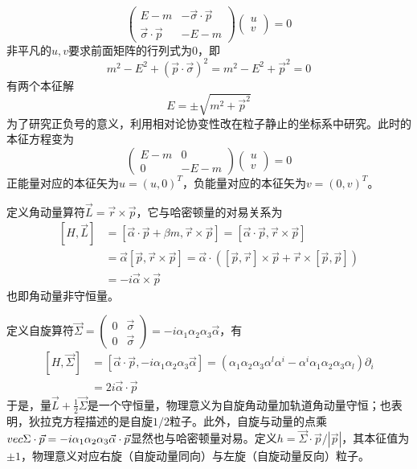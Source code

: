 \documentclass[a4paper,11pt]{ctexart}
\newcommand{\beq}{\begin{equation}}
\newcommand{\eeq}{\end{equation}}
\newcommand{\bea}{\begin{equation}\begin{aligned}}
\newcommand{\eea}{\end{aligned}\end{equation}}
\newcommand{\mt}[4]{\begin{pmatrix}#1 & #2 \\ #3 & #4 \end{pmatrix}}
\begin{document}
\beq
\begin{pmatrix}
E-m & -\vec{\sigma} \cdot \vec{p} \\
\vec{\sigma} \cdot \vec{p} & -E-m
\end{pmatrix}
\begin{pmatrix} u \\ v \end{pmatrix}
=0
\eeq
非平凡的$u,v$要求前面矩阵的行列式为0，即
\beq
m^2 - E^2 + \left( \vec{p} \cdot \vec{\sigma}\right)^2 = m^2 - E^2 + \vec{p}^2 = 0
\eeq
有两个本征解
\beq
E = \pm \sqrt{m^2 + \vec{p}^2}
\eeq
为了研究正负号的意义，利用相对论协变性改在粒子静止的坐标系中研究。此时的本征方程变为
\beq
\mt{E-m}{0}{0}{-E-m} \begin{pmatrix} u \\ v \end{pmatrix} = 0
\eeq
正能量对应的本征矢为$u = (u,0)^T$，负能量对应的本征矢为$v = (0,v)^T$。\par
定义角动量算符$\vec{L} = \vec{r} \times \vec{p}$，它与哈密顿量的对易关系为
\bea
[H,\vec{L}] &= [\vec{\alpha} \cdot \vec{p} + \beta m , \vec{r} \times \vec{p}] = [\vec{\alpha} \cdot \vec{p},\vec{r} \times \vec{p}] \\ &= \vec{\alpha} [\vec{p},\vec{r} \times \vec{p}] = \vec{\alpha} \cdot \left( [\vec{p} ,\vec{r}] \times \vec{p} + \vec{r} \times [\vec{p}, \vec{p}] \right) \\
&= -i \vec{\alpha} \times \vec{p}
\eea
也即角动量非守恒量。
\par
定义自旋算符$\vec{\Sigma} = \mt{0}{\vec{\sigma}}{0}{\vec{\sigma}} = -i \alpha_1 \alpha_2 \alpha_3 \vec{\alpha}$，有
\bea
[H,\vec{\Sigma}] &= [\vec{\alpha} \cdot \vec{p} , -i \alpha_1 \alpha_2 \alpha_3 \vec{\alpha}]  = \left( \alpha_1 \alpha_2 \alpha_3 \alpha^l \alpha^i - \alpha^i \alpha_1 \alpha_2 \alpha_3 \alpha_l \right) \partial_i \\
&=2i \vec{\alpha} \cdot \vec{p}
\eea
于是，量$\vec{L} + \frac{1}{2} \vec{\Sigma}$是一个守恒量，物理意义为自旋角动量加轨道角动量守恒；也表明，狄拉克方程描述的是自旋$1/2$粒子。此外，自旋与动量的点乘$\\vec{\Sigma} \cdot \vec{p} = -i \alpha_1 \alpha_2 \alpha_3 \vec{\alpha} \cdot \vec{p}$显然也与哈密顿量对易。定义$h = \vec{\Sigma}\cdot \vec{p} / | \vec{p} |$，其本征值为$\pm1$，物理意义对应右旋（自旋动量同向）与左旋（自旋动量反向）粒子。
\end{document}
